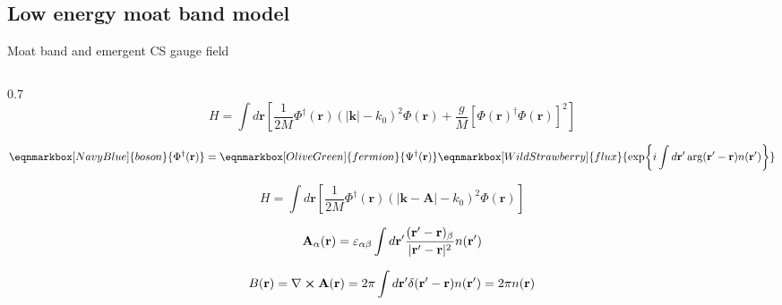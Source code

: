 \subsection{Low energy moat band model}
\begin{frame}{Moat band and emergent CS gauge field}

\begin{columns}
    \begin{column}{0.7\textwidth}
        \begin{equation*}
            H = \int d\mathbf{r} \left[ \frac{1}{2M} \Phi^{\dagger}(\mathbf{r}) (|\mathbf{k}| - k_0)^2 \Phi(\mathbf{r}) + \frac{g}{M} [\Phi(\mathbf{r})^{\dagger} \Phi({\mathbf{r}})]^2 \right]
        \end{equation*}
        
        \begin{equation*}
            \eqnmarkbox[NavyBlue]{boson}{\Phi^{\dagger}(\bf r)} = \eqnmarkbox[OliveGreen]{fermion}{\Psi^{\dagger} (\bf r)} \eqnmarkbox[WildStrawberry]{flux}{\exp{i \int d{\bf r}' \arg({\bf r}' - {\bf r}) n({\bf r}')}}
        \end{equation*}

        \vspace{2mm}
        \begin{block}{}
            \begin{equation*}
                H = \int d\mathbf{r} \left[ \frac{1}{2M} \Phi^{\dagger}(\mathbf{r}) (|\mathbf{k} - \mathbf{A}| - k_0)^2 \Phi(\mathbf{r}) \right]
            \end{equation*}
        
            \begin{equation*}
                \mathbf{A}_\alpha(\mathbf{r})=\varepsilon_{\alpha\beta}\int d\mathbf{r}' \frac{(\mathbf{r}'-\mathbf{r})_\beta}{|\mathbf{r}'-\mathbf{r}|^2} n({\bf r}')
            \end{equation*}
            
            \begin{equation*}
                B(\mathbf{r})=\nabla \cross \mathbf{A}(\mathbf{r})=2\pi\int d\mathbf{r}' \delta(\mathbf{r}'-\mathbf{r}) n(\mathbf{r}') = 2\pi n(\mathbf{r})
            \end{equation*}
        \end{block}
    \end{column}
    
\end{columns}
\end{frame}
